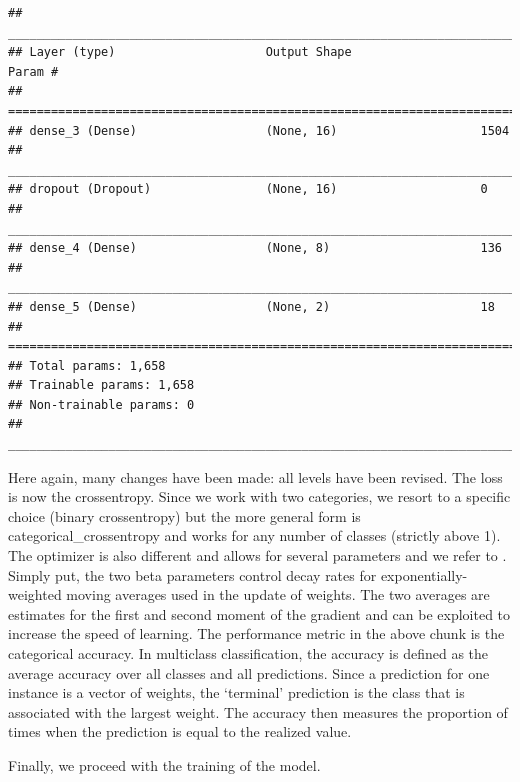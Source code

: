\documentclass[]{krantz}
\theoremstyle{definition}
\theoremstyle{definition}
\theoremstyle{definition}
\theoremstyle{remark}
\begin{document}
\begin{verbatim}
## ___________________________________________________________________________
## Layer (type)                     Output Shape                  Param #     
## ===========================================================================
## dense_3 (Dense)                  (None, 16)                    1504        
## ___________________________________________________________________________
## dropout (Dropout)                (None, 16)                    0           
## ___________________________________________________________________________
## dense_4 (Dense)                  (None, 8)                     136         
## ___________________________________________________________________________
## dense_5 (Dense)                  (None, 2)                     18          
## ===========================================================================
## Total params: 1,658
## Trainable params: 1,658
## Non-trainable params: 0
## ___________________________________________________________________________
\end{verbatim}

\normalsize

Here again, many changes have been made: all levels have been revised.
The loss is now the crossentropy. Since we work with two categories, we
resort to a specific choice (binary crossentropy) but the more general
form is categorical\_crossentropy and works for any number of classes
(strictly above 1). The optimizer is also different and allows for
several parameters and we refer to \citet{kingma2014adam}. Simply put,
the two beta parameters control decay rates for exponentially-weighted
moving averages used in the update of weights. The two averages are
estimates for the first and second moment of the gradient and can be
exploited to increase the speed of learning. The performance metric in
the above chunk is the categorical accuracy. In multiclass
classification, the accuracy is defined as the average accuracy over all
classes and all predictions. Since a prediction for one instance is a
vector of weights, the `terminal' prediction is the class that is
associated with the largest weight. The accuracy then measures the
proportion of times when the prediction is equal to the realized value.

Finally, we proceed with the training of the model.

\footnotesize
\end{document}
